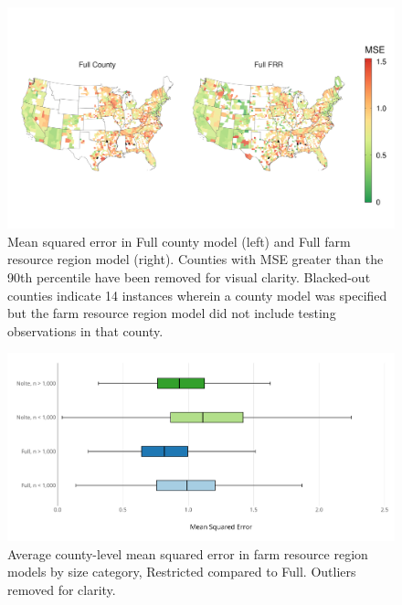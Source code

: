 \documentclass[12pt]{article}
\begin{document}
\begin{figure}[H]
    \centering
    \includegraphics[width=1\textwidth]{exhibits/compare_ffb_fcb_mse.png}
    \caption{Mean squared error in Full county model (left) and Full farm resource region model (right). Counties with MSE greater than the 90th percentile have been removed for visual clarity. Blacked-out counties indicate 14 instances wherein a county model was specified but the farm resource region model did not include testing observations in that county.}
    \label{fig:compare_ffb_fcb_mse}
\end{figure}

\begin{figure}[H]
    \centering
    \includegraphics[width=1\textwidth]{exhibits/frr_compare_mse_size.png}
    \caption{Average county-level mean squared error in farm resource region models by size category, Restricted compared to Full. Outliers removed for clarity.}
    \label{fig:frr_compare_mse_size}
\end{figure}



\newpage
\newpage

\vspace*{200pt}
\end{document}
